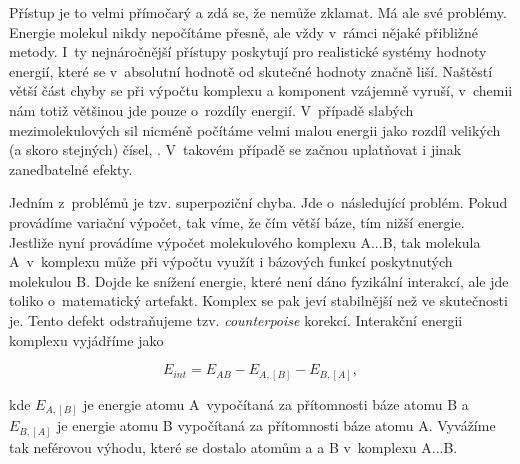 Přístup je to velmi přímočarý a zdá se, že nemůže zklamat. Má ale své problémy. Energie molekul nikdy nepočítáme přesně, ale vždy v~rámci nějaké přibližné metody. I~ty nejnáročnější přístupy poskytují pro realistické systémy hodnoty energií, které se v~absolutní hodnotě od skutečné hodnoty značně liší. Naštěstí větší část chyby se při výpočtu komplexu a komponent vzájemně vyruší, v~chemii nám totiž většinou jde pouze o~rozdíly energií. V~případě slabých mezimolekulových sil nicméně počítáme velmi malou energii jako rozdíl velikých (a skoro stejných) čísel, . V~takovém případě se začnou uplatňovat i jinak zanedbatelné efekty.

Jedním z~problémů je tzv. superpoziční chyba. Jde o~následující problém. Pokud provádíme variační výpočet, tak  víme, že čím větší báze, tím nižší energie. Jestliže nyní provádíme výpočet molekulového komplexu A...B, tak molekula A~v~komplexu může při výpočtu využít i bázových funkcí poskytnutých molekulou B. Dojde ke snížení energie, které není dáno fyzikální interakcí, ale jde toliko o~matematický artefakt. Komplex se pak jeví stabilnější než ve skutečnosti je. Tento defekt odstraňujeme tzv. \textit{counterpoise} korekcí. Interakční energii komplexu vyjádříme jako 

\begin{equation}
E_{int} = E_{AB} - E_{A,[B]} - E_{B,[A]},
\label{rov:MS-13}
\end{equation}

\noindent kde $E_{A,{[B]}}$ je energie atomu A~vypočítaná za přítomnosti báze atomu B a $E_{B,{[A]}}$ je energie atomu B vypočítaná za přítomnosti báze atomu A. Vyvážíme tak neférovou výhodu, které se dostalo atomům a a B v~komplexu A...B.
